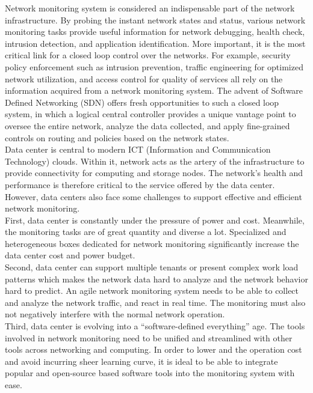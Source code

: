 \documentclass{acm_proc_article-sp}
\begin{document}
Network monitoring system is considered an indispensable part of the network infrastructure. By probing the instant network states and status, various network monitoring tasks provide useful information for network debugging, health check, intrusion detection, and application identification. More important, it is the most critical link for a closed loop control over the networks. For example, security policy enforcement such as intrusion prevention, traffic engineering for optimized network utilization, and access control for quality of services all rely on the information acquired from a network monitoring system. The advent of Software Defined Networking (SDN) offers fresh opportunities to such a closed loop system, in which a logical central controller provides a unique vantage point to oversee the entire network, analyze the data collected, and apply fine-grained controls on routing and policies based on the network states.\\
Data center is central to modern ICT (Information and Communication Technology) clouds. Within it, network acts as the artery of the infrastructure to provide connectivity for computing and storage nodes. The network’s health and performance is therefore critical to the service offered by the data center. However, data centers also face some challenges to support effective and efficient network monitoring.\\
First, data center is constantly under the pressure of power and cost. Meanwhile, the monitoring tasks are of great quantity and diverse a lot. Specialized and heterogeneous boxes dedicated for network monitoring significantly increase the data center cost and power budget.\\
Second, data center can support multiple tenants or present complex work load patterns which makes the network data hard to analyze and the network behavior hard to predict. An agile network monitoring system needs to be able to collect and analyze the network traffic, and react in real time. The monitoring must also not negatively interfere with the normal network operation.\\
Third, data center is evolving into a “software-defined everything” age. The tools involved in network monitoring need to be unified and streamlined with other tools across
networking and computing. In order to lower and the operation cost and avoid incurring sheer learning curve, it is ideal to be able to integrate popular and open-source based software tools into the monitoring system with ease.\\
\end{document}
